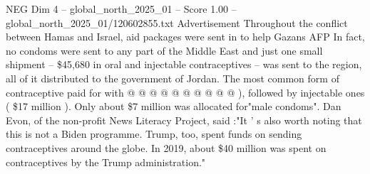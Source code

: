 \begin{textsample}{NEG Dim 4 – global\_north\_2025\_01 – Score 1.00 – global\_north\_2025\_01/120602855.txt}
Advertisement Throughout the conflict between Hamas and Israel, aid packages were sent in to help Gazans AFP In fact, no condoms were sent to any part of the Middle East and just one small shipment -- \$45,680 in oral and injectable contraceptives -- was sent to the region, all of it distributed to the government of Jordan.
The most common form of contraceptive paid for with @ @ @ @ @ @ @ @ @ @ ), followed by injectable ones ( \$17 million ).
Only about \$7 million was allocated for"male condoms".
Dan Evon, of the non-profit News Literacy Project, said :"It ' s also worth noting that this is not a Biden programme.
Trump, too, spent funds on sending contraceptives around the globe.
In 2019, about \$40 million was spent on contraceptives by the Trump administration."

\end{textsample}
